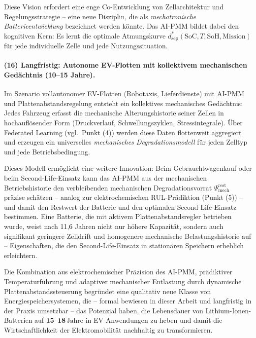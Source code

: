 ﻿\documentclass[12pt,a4paper]{article}
\begin{document}
Diese Vision erfordert eine enge Co-Entwicklung von Zellarchitektur und
Regelungsstrategie -- eine neue Disziplin, die als
\textit{mechatronische Batterieentwicklung} bezeichnet werden könnte.
Das AI-PMM bildet dabei den kognitiven Kern: Es lernt die optimale
Atmungskurve $d_\mathrm{sep}^*(\mathrm{SoC}, T, \mathrm{SoH}, \mathrm{Mission})$
für jede individuelle Zelle und jede Nutzungssituation.

\paragraph{(16) Langfristig: Autonome EV-Flotten mit kollektivem
	mechanischen Gedächtnis (10--15 Jahre).}
Im Szenario vollautonomer EV-Flotten (Robotaxis, Lieferdienste) mit
AI-PMM und Plattenabstandsregelung entsteht ein kollektives mechanisches
Gedächtnis: Jedes Fahrzeug erfasst die mechanische Alterungshistorie
seiner Zellen in hochauflösender Form (Druckverlauf, Schwellungszyklen,
Stressintegrale). Über Federated Learning (vgl.\ Punkt (4)) werden diese
Daten flottenweit aggregiert und erzeugen ein universelles
\textit{mechanisches Degradationsmodell} für jeden Zelltyp und jede
Betriebsbedingung.

Dieses Modell ermöglicht eine weitere Innovation: Beim Gebrauchtwagenkauf
oder beim Second-Life-Einsatz kann das AI-PMM aus der mechanischen
Betriebshistorie den verbleibenden mechanischen Degradationsvorrat
$\Psi_\mathrm{mech}^\mathrm{rest}$ präzise schätzen -- analog zur
elektrochemischen RUL-Prädiktion (Punkt (5)) -- und damit den Restwert
der Batterie und den optimalen Second-Life-Einsatz bestimmen. Eine
Batterie, die mit aktivem Plattenabstandsregler betrieben wurde, weist
nach 11{,}6 Jahren nicht nur höhere Kapazität, sondern auch signifikant
geringere Zelldrift und homogenere mechanische Belastungshistorie auf --
Eigenschaften, die den Second-Life-Einsatz in stationären Speichern
erheblich erleichtern.

Die Kombination aus elektrochemischer Präzision des AI-PMM, prädiktiver
Temperatur\-füh\-rung und adaptiver mechanischer Entlastung durch
dynamische Plattenabstandssteuerung begründet eine qualitativ neue
Klasse von Energiespeichersystemen, die -- formal bewiesen in dieser
Arbeit und langfristig in der Praxis umsetzbar -- das Potenzial haben,
die Lebensdauer von Lithium-Ionen-Batterien auf
$\mathbf{15\text{--}18\,\mathrm{Jahre}}$ in EV-Anwendungen zu heben
und damit die Wirtschaftlichkeit der Elektromobilität nachhaltig zu
transformieren.
	
\end{document}
